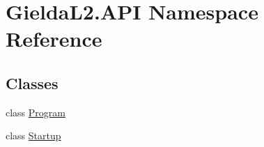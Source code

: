 \hypertarget{namespace_gielda_l2_1_1_a_p_i}{}\section{Gielda\+L2.\+A\+PI Namespace Reference}
\label{namespace_gielda_l2_1_1_a_p_i}
\subsection*{Classes}
\begin{DoxyCompactItemize}
\item 
class \mbox{\hyperlink{class_gielda_l2_1_1_a_p_i_1_1_program}{Program}}
\item 
class \mbox{\hyperlink{class_gielda_l2_1_1_a_p_i_1_1_startup}{Startup}}
\end{DoxyCompactItemize}
